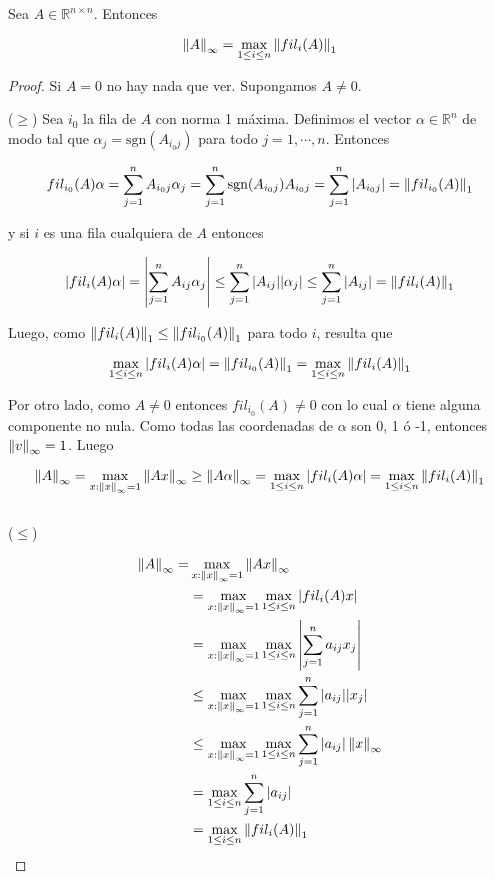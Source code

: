 \begin{propo}
\label{propo:normainf}
Sea $A \in \mathbb{R}^{n \times n}$. Entonces

\[\left\lVert A\right\rVert_{\infty} = \max\limits_{1 \leq i \leq n} \left\lVert fil_i(A)\right\rVert_1\]

\begin{proof} Si $A = 0$ no hay nada que ver. Supongamos $A \neq 0$.

($\geq$) Sea $i_0$ la fila de $A$ con norma 1 máxima. Definimos el vector $\alpha \in \mathbb{R}^n$ de modo tal que $\alpha_j = \text{sgn}(A_{i_0j})$ para todo $j = 1, \cdots, n$. Entonces 

\[fil_{i_0}(A)\alpha = \sum_{j = 1}^n A_{i_0j}\alpha_j = \sum_{j = 1}^n \text{sgn}(A_{i_0j})A_{i_0j} = \sum_{j = 1}^n |A_{i_0j}| = \left\lVert fil_{i_0}(A)\right\rVert_1\]

y si $i$ es una fila cualquiera de $A$ entonces 

\[|fil_{i}(A)\alpha| = \left|\sum_{j = 1}^n A_{ij}\alpha_j\right| \leq \sum_{j = 1}^n |A_{ij}||\alpha_j| \leq \sum_{j = 1}^n |A_{ij}| = \left\lVert fil_{i}(A)\right\rVert_1\]

Luego, como $\left\lVert fil_i(A)\right\rVert_1 \leq \left\lVert fil_{i_0}(A)\right\rVert_1$ para todo $i$, resulta que

\[\max\limits_{1 \leq i \leq n}|fil_i(A)\alpha| = \left\lVert fil_{i_0}(A)\right\rVert_1 = \max\limits_{1 \leq i \leq n} \left\lVert fil_i(A)\right\rVert_1\]

Por otro lado, como $A \neq 0$ entonces $fil_{i_0}(A) \neq 0$ con lo cual $\alpha$ tiene alguna componente no nula. Como todas las coordenadas de $\alpha$ son 0, 1 ó -1, entonces $\left\lVert v\right\rVert_{\infty} = 1$. Luego

\[\left\lVert A\right\rVert_{\infty} = \max\limits_{x : \left\lVert x\right\rVert_{\infty} = 1} \left\lVert Ax\right\rVert_{\infty} \geq \left\lVert A\alpha\right\rVert_{\infty} = \max\limits_{1 \leq i \leq n} |fil_i(A)\alpha| = \max\limits_{1 \leq i \leq n} \left\lVert fil_i(A)\right\rVert_1\]
\\[0.25cm]
($\leq$) 

\begin{align*}
\left\lVert A\right\rVert_{\infty} = &\max\limits_{x : \left\lVert x\right\rVert_{\infty} = 1} \left\lVert Ax\right\rVert_{\infty}\\
& =\max\limits_{x : \left\lVert x\right\rVert_{\infty} = 1} \max\limits_{1 \leq i \leq n} |fil_i(A)x|\\
& = \max\limits_{x : \left\lVert x\right\rVert_{\infty} = 1} \max\limits_{1 \leq i \leq n} \left|\sum_{j = 1}^n a_{ij} x_j\right|\\
& \leq \max\limits_{x : \left\lVert x\right\rVert_{\infty} = 1} \max\limits_{1 \leq i \leq n} \sum_{j = 1}^n |a_{ij}||x_j|\\
& \leq \max\limits_{x : \left\lVert x\right\rVert_{\infty} = 1} \max\limits_{1 \leq i \leq n} \sum_{j = 1}^n |a_{ij}|\left\lVert x\right\rVert_{\infty}\\
& = \max\limits_{1 \leq i \leq n} \sum_{j = 1}^n |a_{ij}|\\
& = \max\limits_{1 \leq i \leq n} \left\lVert fil_i(A)\right\rVert_1
\end{align*}
\end{proof}

\end{propo}

